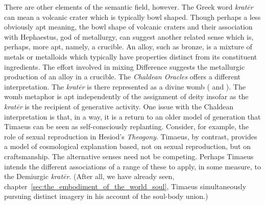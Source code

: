 There are other elements of the semantic field, however. The Greek word \emph{kratēr} can mean a volcanic crater which is typically bowl shaped. Though perhaps a less obviously apt meaning, the bowl shape of volcanic craters and their association with Hephaestus, god of metallurgy, can suggest another related sense which is, perhaps, more apt, namely, a crucible. An alloy, such as bronze, is a mixture of metals or metalloids which typically have properties distinct from its constituent ingredients. The effort involved in mixing Difference suggests the metallurgic production of an alloy in a crucible. The \emph{Chaldean Oracles} offers a different interpretation. The \emph{kratēr} is there represented as a divine womb (\citealt[]{Brisson:2003aa} and ). The womb metaphor is apt independently of the assignment of deity insofar as the \emph{kratēr} is the recipient of generative activity. One issue with the Chaldean interpretation is that, in a way, it is a return to an older model of generation that Timaeus can be seen as self-consciously replanting. Consider, for example, the role of sexual reproduction in Hesiod's \emph{Theogony}. Timaeus, by contrast, provides a model of cosmological explanation based, not on sexual reproduction, but on craftsmanship. The alternative senses need not be competing. Perhaps Timaeus intends the different associations of a range of these to apply, in some measure, to the Demiurgic \emph{kratēr}. (After all, we have already seen, chapter~\ref{sec:the_embodiment_of_the_world_soul}, Timaeus simultaneously pursuing distinct imagery in his account of the soul-body union.)

